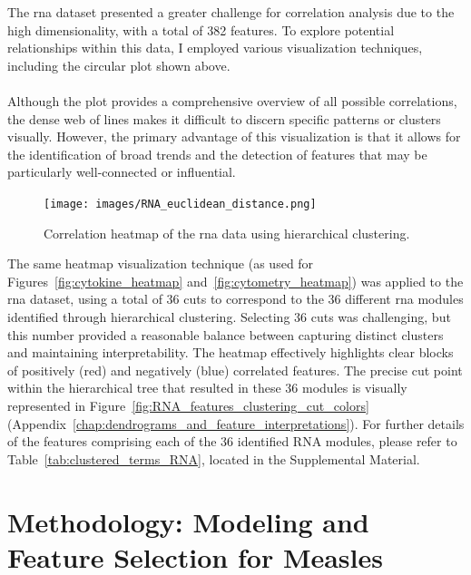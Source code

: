 \documentclass[12pt,a4paper]{report}
\newcommand{\todo}[1]{%
  \par\noindent%
  \begin{tcolorbox}[colback=yellow, colframe=black, boxrule=0.5pt, sharp corners, width=\linewidth, before skip=5pt, after skip=5pt]
    \textbf{TODO:} #1
  \end{tcolorbox}%
  \par
}
\begin{document}
The \acrshort{rna} dataset presented a greater challenge for correlation analysis due to the high dimensionality, with a total of 382 features. To explore potential relationships within this data, I employed various visualization techniques, including the circular plot shown above.\\
\\
 Although the plot provides a comprehensive overview of all possible correlations, the dense web of lines makes it difficult to discern specific patterns or clusters visually. However, the primary advantage of this visualization is that it allows for the identification of broad trends and the detection of features that may be particularly well-connected or influential.

\begin{figure}[H]
  \centering
  \texttt{[image: images/RNA\_euclidean\_distance.png]}
  \caption[\acrshort{rna} data correlations]{Correlation heatmap of the \acrshort{rna} data using hierarchical clustering.}
  \label{fig:RNA_heatmap}
\end{figure}

\noindent
The same heatmap visualization technique (as used for Figures~\ref{fig:cytokine_heatmap} and~\ref{fig:cytometry_heatmap}) was applied to the \acrshort{rna} dataset, using a total of 36 cuts to correspond to the 36 different \acrshort{rna} modules identified through hierarchical clustering. Selecting 36 cuts was challenging, but this number provided a reasonable balance between capturing distinct clusters and maintaining interpretability. The heatmap effectively highlights clear blocks of positively (red) and negatively (blue) correlated features. The precise cut point within the hierarchical tree that resulted in these 36 modules is visually represented in Figure~\ref{fig:RNA_features_clustering_cut_colors} (Appendix~\ref{chap:dendrograms_and_feature_interpretations}). For further details of the features comprising each of the 36 identified RNA modules, please refer to Table~\ref{tab:clustered_terms_RNA}, located in the Supplemental Material.





\chapter{Methodology: Modeling and Feature Selection for Measles}
\end{document}

